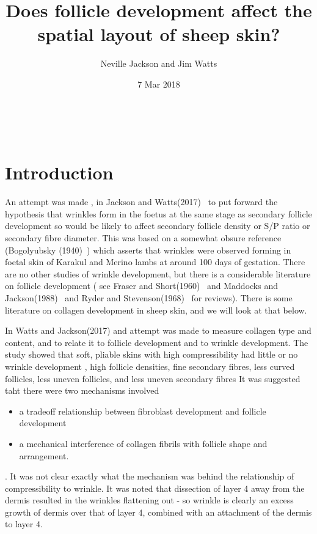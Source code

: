 \documentclass[titlepage]{article}  %
\title{Does follicle development affect the spatial layout of sheep skin?}
\author{Neville Jackson and Jim Watts}
\date{7 Mar 2018}
\begin{document}
 


 
\maketitle      
\tableofcontents

$\newcommand{\E}{\mathrm{E}}$
$\newcommand{\Var}{\mathrm{Var}}$
$\newcommand{\Cov}{\mathrm{Cov}}$ 
$\newcommand{\SD}{\mathrm{SD}}$ 

\clearpage
\section{Introduction} 
 An attempt was made , in Jackson and Watts(2017)~\cite{jack:17b} to put forward the hypothesis that wrinkles form in the foetus at the same stage as secondary follicle development so would be likely to affect secondary follicle density or S/P ratio or secondary fibre diameter. This was based on a somewhat obsure reference (Bogolyubsky (1940)~\cite{bogo:40}) which asserts that wrinkles were observed forming in foetal skin of Karakul and Merino lambs at around 100 days of gestation. There are no other studies of wrinkle development, but there is a considerable literature on follicle development ( see Fraser and Short(1960)~\cite{fras:60} and Maddocks and Jackson(1988)~\cite{madd:88} and Ryder and Stevenson(1968)~\cite{ryde:68} for reviews). There is some literature on collagen development in sheep skin, and we will look at that below.

In Watts and Jackson(2017) and attempt was made to measure collagen type and content, and to relate it to follicle development and to wrinkle development. The study showed that soft, pliable skins with high compressibility had little or no wrinkle development , high follicle densities, fine secondary fibres, less curved follicles, less uneven follicles, and less uneven secondary fibres It was suggested taht there were two mechanisms involved
\begin{itemize}
\item a tradeoff relationship between fibroblast development and follicle development
\item a mechanical interference of collagen fibrils with follicle shape and arrangement.
\end{itemize}.
It was not clear exactly what the mechanism was behind the relationship of compressibility to wrinkle. It was noted that dissection of layer 4 away from the dermis resulted in the wrinkles flattening out - so wrinkle is clearly an excess growth of dermis over that of layer 4, combined with an attachment of the dermis to layer 4.
\end{document}
